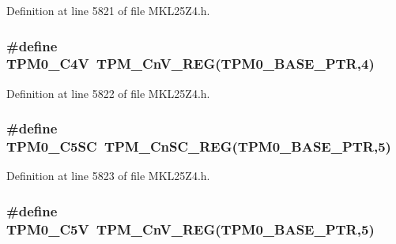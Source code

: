 Definition at line 5821 of file M\+K\+L25\+Z4.\+h.

\subsubsection[{\texorpdfstring{T\+P\+M0\+\_\+\+C4V}{TPM0_C4V}}]{\setlength{\rightskip}{0pt plus 5cm}\#define T\+P\+M0\+\_\+\+C4V~{\bf T\+P\+M\+\_\+\+Cn\+V\+\_\+\+R\+EG}({\bf T\+P\+M0\+\_\+\+B\+A\+S\+E\+\_\+\+P\+TR},4)}\hypertarget{group___t_p_m___register___accessor___macros_gad398101158c4659ab5026fe21d7b36df}{}\label{group___t_p_m___register___accessor___macros_gad398101158c4659ab5026fe21d7b36df}


Definition at line 5822 of file M\+K\+L25\+Z4.\+h.

\subsubsection[{\texorpdfstring{T\+P\+M0\+\_\+\+C5\+SC}{TPM0_C5SC}}]{\setlength{\rightskip}{0pt plus 5cm}\#define T\+P\+M0\+\_\+\+C5\+SC~{\bf T\+P\+M\+\_\+\+Cn\+S\+C\+\_\+\+R\+EG}({\bf T\+P\+M0\+\_\+\+B\+A\+S\+E\+\_\+\+P\+TR},5)}\hypertarget{group___t_p_m___register___accessor___macros_ga443eae4be47dd76cb50e2e61f3ecd435}{}\label{group___t_p_m___register___accessor___macros_ga443eae4be47dd76cb50e2e61f3ecd435}


Definition at line 5823 of file M\+K\+L25\+Z4.\+h.

\subsubsection[{\texorpdfstring{T\+P\+M0\+\_\+\+C5V}{TPM0_C5V}}]{\setlength{\rightskip}{0pt plus 5cm}\#define T\+P\+M0\+\_\+\+C5V~{\bf T\+P\+M\+\_\+\+Cn\+V\+\_\+\+R\+EG}({\bf T\+P\+M0\+\_\+\+B\+A\+S\+E\+\_\+\+P\+TR},5)}\hypertarget{group___t_p_m___register___accessor___macros_ga675972517636ee1a7fe631eee7e34587}{}\label{group___t_p_m___register___accessor___macros_ga675972517636ee1a7fe631eee7e34587}


